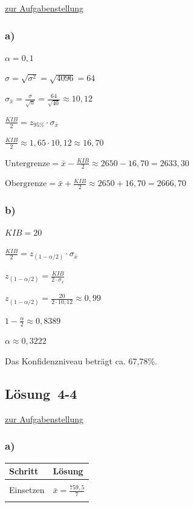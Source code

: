 \documentclass[
  11pt,
  ngerman,
  a4paper,
]{report}
\begin{document}
\protect\hyperlink{aufgabe-4-3}{zur Aufgabenstellung}

\hypertarget{a-14}{%
\subsubsection{a)}\label{a-14}}

\(\alpha=0{,}1\)

\(\sigma=\sqrt{\sigma^2}=\sqrt{4096}=64\)

\(\sigma_{\bar{x}}=\frac{\sigma}{\sqrt{n}}=\frac{64}{\sqrt{40}}\approx10{,}12\)

\(\frac{\mathit{KIB}}{2}=z_{95\%} \cdot \sigma_{\bar{x}}\)

\(\frac{\mathit{KIB}}{2}\approx 1{,}65 \cdot 10{,}12\approx16{,}70\)

\(\textrm{Untergrenze} = \bar{x} - \frac{\mathit{KIB}}{2} \approx 2650 - 16{,}70 = 2633{,}30\)

\(\textrm{Obergrenze} = \bar{x} + \frac{\mathit{KIB}}{2} \approx 2650 + 16{,}70 = 2666{,}70\)

\hypertarget{b-14}{%
\subsubsection{b)}\label{b-14}}

\(\mathit{KIB}=20\)

\(\frac{\mathit{KIB}}{2}=z_{(1-\alpha/2)} \cdot \sigma_{\bar{x}}\)

\(z_{(1-\alpha/2)}=\frac{\mathit{KIB}}{2\cdot \sigma_{\bar{x}}}\)

\(z_{(1-\alpha/2)}=\frac{20}{2 \cdot 10{,}12}\approx0{,}99\)

\(1-\frac{\alpha}{2}\approx0{,}8389\)

\(\alpha\approx 0{,}3222\)

Das Konfidenzniveau beträgt ca. 67,78\%.

\hypertarget{loesung-4-4}{%
\subsection{Lösung~4-4}\label{loesung-4-4}}

\protect\hyperlink{aufgabe-4-4}{zur Aufgabenstellung}

\hypertarget{a-15}{%
\subsubsection{a)}\label{a-15}}

\begin{table}[H]
\centering
\begin{tabular}{l>{\raggedright\arraybackslash}p{8cm}}
\toprule
\textbf{Schritt} & \textbf{Lösung}\\
\midrule
\cellcolor{gray!6}{Formel} & \cellcolor{gray!6}{$\bar{x}=\frac{\sum\limits_{i=1}^{n}x_{i}}{n}$}\\
Einsetzen & $\bar{x}=\frac{759{,}5}{7}$\\
\cellcolor{gray!6}{Ergebnis} & \cellcolor{gray!6}{$\bar{x}=108{,}5$}\\
\bottomrule
\end{tabular}
\end{table}
\end{document}

